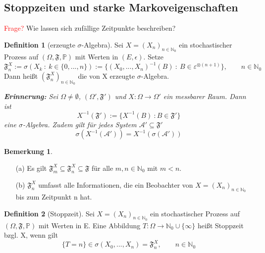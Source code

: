 \documentclass[a4paper,12pt]{scrartcl}
\theoremstyle{definition}
\newtheorem{bem}{Bemerkung}[section]
\newtheorem{defi}{Definition}[section]
\begin{document}
\subsection{Stoppzeiten und starke Markoveigenschaften}
\noindent
\textcolor{red}{Frage?} Wie lassen sich zufällige Zeitpunkte beschreiben?
\begin{defi}[erzeugte $\sigma$-Algebra]
Sei $X=(X_{n})_{n \in \mathbb{N}_{0}}$ ein stochastischer Prozess auf $(\Omega,\mathfrak{F},\mathbb{P})$ mit Werten in $(E,\epsilon)$. Setze
\begin{equation*}
\mathfrak{F}_{n}^{X} := \sigma(X_{k} \: : \: k \in \lbrace 0,...,n \rbrace) := \lbrace (X_{0},...,X_{n})^{-1}(B) \: : \: B \in  \varepsilon^{ \otimes (n+1)} \rbrace, \qquad n \in \mathbb{N}_{0} 
\end{equation*}
Dann heißt $(\mathfrak{F}_{n}^{X})_{n \in \mathbb{N}_{0}}$ die von X erzeugte $\sigma$-Algebra.
\end{defi}
\noindent
\textit{\textbf{Erinnerung:} Sei $\Omega \neq \emptyset$, $(\Omega', \mathfrak{F}')$ und $X: \Omega \to \Omega'$ ein messbarer Raum. Dann ist
\begin{equation*}
X^{-1}(\mathfrak{F}') := \lbrace X^{-1}(B) \: : B \in \mathfrak{F}' \rbrace
\end{equation*}
eine $\sigma$-Algebra. Zudem gilt für jedes System $\mathcal{A}' \subseteq \mathfrak{F}'$
\begin{equation*}
\sigma(X^{-1}(\mathcal{A}')) = X^{-1}(\sigma(\mathcal{A}'))
\end{equation*}
}
\begin{bem}
\mbox{}
\begin{itemize}
\item[(a)]Es gilt $\mathfrak{F}_{m}^{X} \subseteq \mathfrak{F}_{n}^{X} \subseteq \mathfrak{F}$ für alle $m,n \in \mathbb{N}_{0}$ mit $m<n$.
\item[(b)]$\mathfrak{F}_{n}^{X}$ umfasst alle Informationen, die ein Beobachter von $X=(X_{n})_{n \in \mathbb{N}_{0}}$ bis zum Zeitpunkt n hat. 
\end{itemize}
\end{bem}
\begin{defi}[Stoppzeit]
Sei $X= (X_{n})_{n \in \mathbb{N}_{0}}$ ein stochastischer Prozess auf $(\Omega,\mathfrak{F},\mathbb{P})$ mit Werten in E. Eine Abbildung $T: \Omega \to \mathbb{N}_{0} \cup \lbrace \infty \rbrace $ heißt Stoppzeit bzgl. X, wenn gilt
\begin{equation*}
\lbrace T = n \rbrace \in \sigma(X_{0},...,X_{n}) = \mathfrak{F}_{n}^{X}, \qquad n \in \mathbb{N}_{0}
\end{equation*}
\end{defi}
\end{document}

